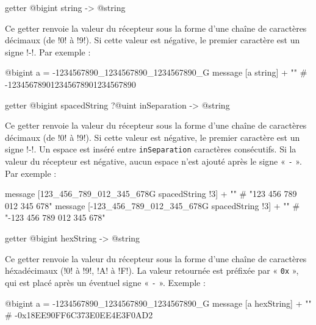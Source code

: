 
\begin{galgasbox}
getter @bigint string -> @string
\end{galgasbox}

Ce getter renvoie la valeur du récepteur sous la forme d'une chaîne de caractères décimaux (de \ggs!0! à \ggs!9!). Si cette valeur est négative, le premier caractère est un signe \ggs!-!. Par exemple :

\begin{galgas}
@bigint a = -1234567890_1234567890_1234567890_G
message [a string] + "\n" # -123456789012345678901234567890
\end{galgas}




\begin{galgasbox}
getter @bigint spacedString ?@uint inSeparation -> @string
\end{galgasbox}

Ce getter renvoie la valeur du récepteur sous la forme d'une chaîne de caractères décimaux (de \ggs!0! à \ggs!9!). Si cette valeur est négative, le premier caractère est un signe \ggs!-!. Un espace est inséré entre \texttt{inSeparation} caractères consécutifs. Si la valeur du récepteur est négative, aucun espace n'est ajouté après le signe « \texttt{-} ». Par exemple :

\begin{galgas}
message [123_456_789_012_345_678G spacedString !3] + "\n" # "123 456 789 012 345 678"
message [-123_456_789_012_345_678G spacedString !3] + "\n" # "-123 456 789 012 345 678"
\end{galgas}






\begin{galgasbox}
getter @bigint hexString -> @string
\end{galgasbox}

Ce getter renvoie la valeur du récepteur sous la forme d'une chaîne de caractères héxadécimaux (\ggs!0! à \ggs!9!, \ggs!A! à \ggs!F!). La valeur retournée est préfixée par « \texttt{0x} », qui est placé après un éventuel signe « \texttt{-} ». Exemple :

\begin{galgas}
@bigint a = -1234567890_1234567890_1234567890_G
message [a hexString] + "\n" # -0x18EE90FF6C373E0EE4E3F0AD2
\end{galgas}








